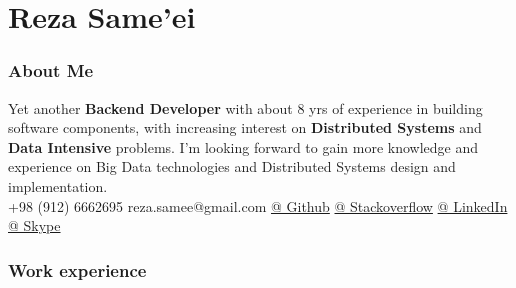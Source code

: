 \documentclass{tccv}
\begin{document}
\part{Reza Same'ei}

\section{About Me}
Yet another \textbf{Backend Developer} with about 8 yrs of experience in building software components, with increasing interest on \textbf{Distributed Systems} and \textbf{Data Intensive} problems. I’m looking forward to gain more knowledge and experience on Big Data technologies and Distributed Systems design and implementation.\\

  {+98 (912) 6662695}
  {reza.samee@gmail.com}
  {\href{https://github.com/sameei}{@ Github}}
  {\href{https://stackoverflow.com/users/998642/reza-sameei}{@ Stackoverflow}}
  {\href{http://linkedin.com/in/reza-sameei/}{@ LinkedIn}}
  {\href{https://join.skype.com/invite/nINGOAMPxZdX}{@ Skype}}

\section{Work experience}
\end{document}
